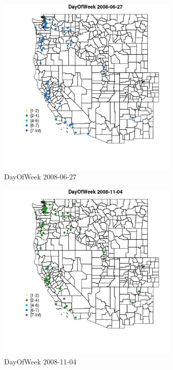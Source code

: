 \begin{figure} 
\centering  
\includegraphics[width=0.77\textwidth]{Code_Outputs/Report_ML_input_PM25_Step4_part_e_de_duplicated_aves_MapObsDayOfWeek2008-06-27.jpg} 
\caption{\label{fig:Report_ML_input_PM25_Step4_part_e_de_duplicated_avesMapObsDayOfWeek2008-06-27}DayOfWeek 2008-06-27} 
\end{figure} 
 

\begin{figure} 
\centering  
\includegraphics[width=0.77\textwidth]{Code_Outputs/Report_ML_input_PM25_Step4_part_e_de_duplicated_aves_MapObsDayOfWeek2008-11-04.jpg} 
\caption{\label{fig:Report_ML_input_PM25_Step4_part_e_de_duplicated_avesMapObsDayOfWeek2008-11-04}DayOfWeek 2008-11-04} 
\end{figure} 
 


